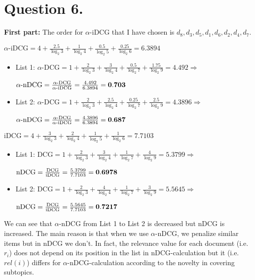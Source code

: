 \documentclass[11pt]{article}
\begin{document}
\section*{Question 6.}%

{\bf First part:}
The order  for $\alpha \text{-iDCG}$ that I have chosen is $d_8, d_3, d_5, d_1, d_6, d_2, d_4, d_7$.

$\alpha \text{-iDCG} = 4+\frac{2.5}{\log_2 3}+\frac{1}{\log_2 4}+\frac{0.5}{\log_2 5}+\frac{0.25}{\log_2 6} = 6.3894$
\begin{itemize}
\item List 1: $\alpha\text{-DCG} = 1+\frac{2}{\log_2 3}+\frac{3}{\log_2 4}+\frac{0.5}{\log_2 7}+\frac{1.75}{\log_2 9} = 4.492 \Longrightarrow$ 

$\alpha\text{-nDCG} = \frac{\alpha\text{-DCG}}{\alpha\text{-iDCG}} = \frac{4.492}{6.3894}= {\bf 0.703}$

\item List 2: $\alpha\text{-DCG} = 1+\frac{2}{\log_2 3}+\frac{2.5}{\log_2 4}+\frac{0.25}{\log_2 7}+\frac{2.5}{\log_2 9} = 4.3896 \Longrightarrow$ 

$\alpha\text{-nDCG} = \frac{\alpha\text{-DCG}}{\alpha\text{-iDCG}} = \frac{4.3896}{6.3894}= {\bf 0.687}$
\end{itemize}

\hspace{-6mm}{\bf Second part:}

$\text{iDCG} = 4+\frac{3}{\log_2 3}+\frac{2}{\log_2 4}+\frac{1}{\log_2 5}+\frac{1}{\log_2 6} = 7.7103$
\begin{itemize}
\item List 1: $\text{DCG} = 1+\frac{2}{\log_2 3}+\frac{3}{\log_2 4}+\frac{1}{\log_2 7}+\frac{4}{\log_2 9} = 5.3799  \Longrightarrow$ 

$\text{nDCG} = \frac{\text{DCG}}{\text{iDCG}} = \frac{5.3799}{7.7103}= {\bf 0.6978}$

\item List 2: $\text{DCG} = 1+\frac{2}{\log_2 3}+\frac{4}{\log_2 4}+\frac{1}{\log_2 7}+\frac{3}{\log_2 9} = 5.5645 \Longrightarrow$ 

$\text{nDCG} = \frac{\text{DCG}}{\text{iDCG}} = \frac{5.5645}{7.7103}= {\bf 0.7217}$
\end{itemize}

\hspace{-6mm}{\bf Third part:} 

We can see that $\alpha\text{-nDCG}$ from List 1 to List 2 is decreased but $\text{nDCG}$ is increased. The main reason is that when we use $\alpha\text{-nDCG}$, we penalize similar items but in $\text{nDCG}$ we don't. In fact, the relevance value for each document (i.e. $r_i$) does not depend on its position in the list in $\text{nDCG}$-calculation but it (i.e. $rel(i)$) differs for $\alpha\text{-nDCG}$-calculation according to the novelty in covering subtopics. 
\end{document}
